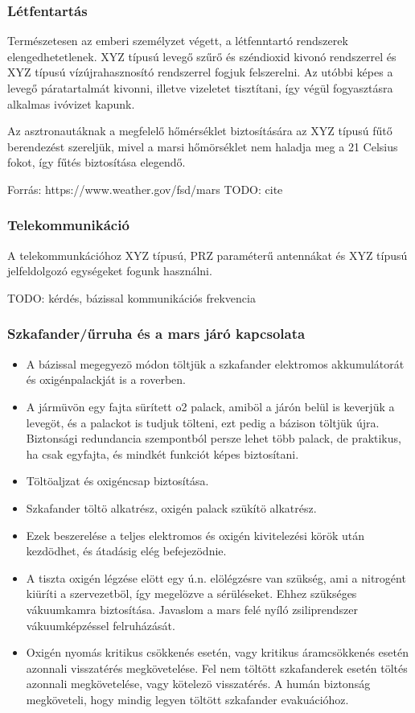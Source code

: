 \documentclass[12pt]{report}
\begin{document}
\subsubsection{Létfentartás}

Természetesen az emberi személyzet végett, a létfenntartó rendszerek elengedhetetlenek. XYZ típusú levegő szűrő és széndioxid kivonó rendszerrel és XYZ típusú vízújrahasznosító rendszerrel fogjuk felszerelni. Az utóbbi képes a levegő páratartalmát kivonni, illetve vizeletet tisztítani, így végül fogyasztásra alkalmas ivóvizet kapunk.

Az asztronautáknak a megfelelő hőmérséklet biztosítására az XYZ típusú fűtő berendezést szereljük, mivel a marsi hőmörséklet nem haladja meg a 21 Celsius fokot, így fűtés biztosítása elegendő.

Forrás: https://www.weather.gov/fsd/mars
TODO: cite

\subsubsection{Telekommunikáció}

A telekommunkációhoz XYZ típusú, PRZ paraméterű antennákat és XYZ típusú jelfeldolgozó egységeket fogunk használni.

TODO: kérdés, bázissal kommunikációs frekvencia

\subsubsection{Szkafander/űrruha és a mars járó kapcsolata}
\begin{itemize}

  \item A bázissal megegyezö módon töltjük a szkafander elektromos akkumulátorát és oxigénpalackját is a roverben.
  \item A jármüvön egy fajta sürített o2 palack, amiböl a járón belül is keverjük a levegöt, és a palackot is tudjuk tölteni, ezt pedig a bázison töltjük újra. Biztonsági redundancia szempontból persze lehet több palack, de praktikus, ha csak egyfajta, és mindkét funkciót képes biztosítani.
  \item Töltöaljzat és oxigéncsap biztosítása.
  \item Szkafander töltö alkatrész, oxigén palack szükítö alkatrész.
  \item Ezek beszerelése a teljes elektromos és oxigén kivitelezési körök után kezdödhet, és átadásig elég befejezödnie.
  \item A tiszta oxigén légzése elött egy ú.n. elölégzésre van szükség, ami a nitrogént kiüríti a szervezetböl, így megelözve a sérüléseket. Ehhez szükséges vákuumkamra biztosítása. Javaslom a mars felé nyíló zsiliprendszer vákuumképzéssel felruházását.
  \item Oxigén nyomás kritikus csökkenés esetén, vagy kritikus áramcsökkenés esetén azonnali visszatérés megkövetelése. Fel nem töltött szkafanderek esetén töltés azonnali megkövetelése, vagy kötelezö visszatérés. A humán biztonság megköveteli, hogy mindig legyen töltött szkafander evakuációhoz.
\end{itemize}
\end{document}
